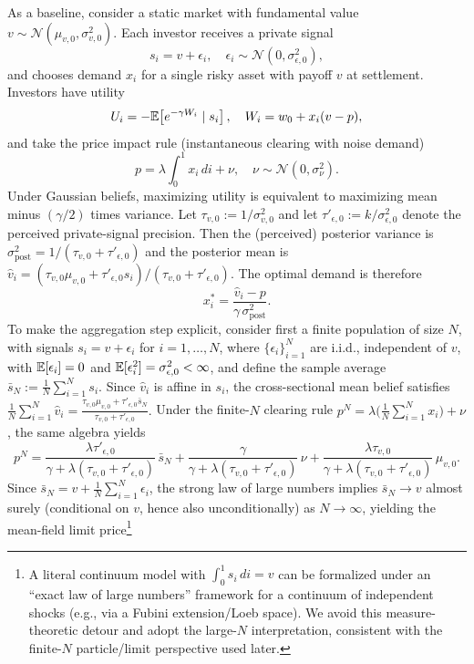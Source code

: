 As a baseline, consider a static market with fundamental value $v \sim \mathcal{N}(\mu_{v,0},\sigma_{v,0}^2)$. Each investor receives a private signal
\begin{equation}
s_i = v + \epsilon_i, \quad \epsilon_i \sim \mathcal{N}(0, \sigma_{\epsilon,0}^2),
\end{equation}
and chooses demand $x_i$ for a single risky asset with payoff $v$ at settlement. Investors have \CARA utility
\begin{equation}
U_i = -\mathbb{E}\!\left[e^{-\gamma W_i}\mid s_i\right], \quad W_i = w_0 + x_i(v-p),
\end{equation}
and take the price impact rule (instantaneous clearing with noise demand)
\begin{equation}
p = \lambda \int_0^1 x_i\,di + \nu,\quad \nu \sim \mathcal{N}(0,\sigma_\nu^2).
\end{equation}
Under Gaussian beliefs, maximizing \CARA utility is equivalent to maximizing mean minus $(\gamma/2)$ times variance. Let $\tau_{v,0}:=1/\sigma_{v,0}^2$ and let $\tau'_{\epsilon,0}:=k/\sigma_{\epsilon,0}^2$ denote the perceived private-signal precision. Then the (perceived) posterior variance is $\sigma^2_{\text{post}} = 1/(\tau_{v,0}+\tau'_{\epsilon,0})$ and the posterior mean is $\hat v_i = (\tau_{v,0}\mu_{v,0} + \tau'_{\epsilon,0} s_i)/(\tau_{v,0}+\tau'_{\epsilon,0})$. The optimal demand is therefore
\begin{equation}
x_i^* = \frac{\hat v_i - p}{\gamma\,\sigma^2_{\text{post}}}.
\end{equation}
To make the aggregation step explicit, consider first a finite population of size $N$, with signals $s_i=v+\epsilon_i$ for $i=1,\dots,N$, where $\{\epsilon_i\}_{i=1}^N$ are i.i.d., independent of $v$, with $\mathbb{E}[\epsilon_i]=0$ and $\mathbb{E}[\epsilon_i^2]=\sigma_{\epsilon,0}^2<\infty$, and define the sample average $\bar s_N := \frac{1}{N}\sum_{i=1}^N s_i$.
Since $\hat v_i$ is affine in $s_i$, the cross-sectional mean belief satisfies
$
\frac{1}{N}\sum_{i=1}^N \hat v_i
=\frac{\tau_{v,0}\mu_{v,0}+\tau'_{\epsilon,0} \bar s_N}{\tau_{v,0}+\tau'_{\epsilon,0}}.
$
Under the finite-$N$ clearing rule $p^N=\lambda\big(\frac1N\sum_{i=1}^N x_i\big)+\nu$, the same algebra yields
\[
p^N
= \frac{\lambda \tau'_{\epsilon,0}}{\gamma + \lambda(\tau_{v,0}+\tau'_{\epsilon,0})}\,\bar s_N
 + \frac{\gamma}{\gamma + \lambda(\tau_{v,0}+\tau'_{\epsilon,0})}\,\nu
 + \frac{\lambda\tau_{v,0}}{\gamma + \lambda(\tau_{v,0}+\tau'_{\epsilon,0})}\,\mu_{v,0}.
\]
Since $\bar s_N=v+\frac1N\sum_{i=1}^N \epsilon_i$, the strong law of large numbers implies $\bar s_N\to v$ almost surely (conditional on $v$, hence also unconditionally) as $N\to\infty$, yielding the mean-field limit price\footnote{A literal continuum model with $\int_0^1 s_i\,di=v$ can be formalized under an ``exact law of large numbers'' framework for a continuum of independent shocks (e.g., via a Fubini extension/Loeb space). We avoid this measure-theoretic detour and adopt the large-$N$ interpretation, consistent with the finite-$N$ particle/limit perspective used later.}
